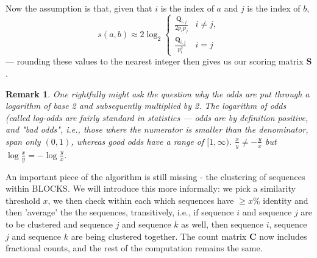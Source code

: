 \documentclass{article}
\newtheorem{remark}{Remark}
\begin{document}
Now the assumption is that, given that $i$ is the index of $a$ and $j$ is the index of $b$,
\begin{equation*}
	s(a, b) \approx	2 \log_2 \begin{cases}
		\frac{\mathbf Q_{i, j}}{2p_ip_j} & i \ne j, \\
		\frac{\mathbf Q_{i, j}}{p_i^2} & i = j
	\end{cases}
\end{equation*}
--- rounding these values to the nearest integer then gives us our scoring matrix $\mathbf S$.

\begin{remark}
	One rightfully might ask the question why the odds are put through a logarithm of base 2 and subsequently multiplied by 2.
	The logarithm of odds (called \emph{log-odds} are fairly standard in statistics --- odds are by definition positive, and "bad odds", i.e., those where the numerator is smaller than the denominator, span only $(0, 1)$, whereas good odds have a range of $[1, \infty)$. $\frac x y \ne -\frac y x$ but $\log \frac x y = - \log \frac y x $.
	\end{remark}

An important piece of the algorithm is still missing - the clustering of sequences within BLOCKS.
We will introduce this more informally: we pick a similarity threshold $x$, we
then check within each  which sequences have $\ge x$\% identity and
then 'average' the the sequences, transitively, i.e., if sequence $i$ and
sequence $j$ are to be clustered and sequence $j$ and sequence $k$ as well,
then sequence $i$, sequence $j$ and sequence $k$ are being clustered together.
The count matrix $\mathbf C$ now includes fractional counts, and the rest of the computation remains the same.
\end{document}

